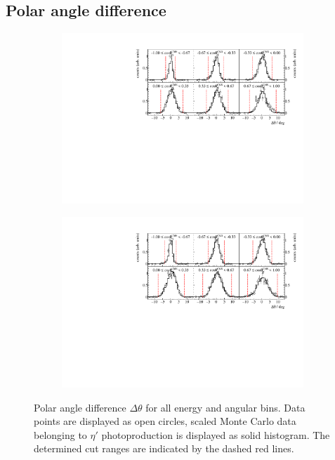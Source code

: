 \subsection{Polar angle difference}
\begin{figure}[H]
	\centering
	\begin{subfigure}{\linewidth}
		\includegraphics[width=\linewidth]{../figs/hydrogen/bin_cuts/thetacut_ebin1.pdf}
	\end{subfigure}
	
	\begin{subfigure}{\linewidth}
		\includegraphics[width=\linewidth]{../figs/hydrogen/bin_cuts/thetacut_ebin2.pdf}
	\end{subfigure}
\caption{Polar angle difference $\Delta\theta$ for all energy and angular bins. Data points are displayed as open circles, scaled Monte Carlo data belonging to $\eta'$ photoproduction is displayed as solid histogram. The determined cut ranges are indicated by the dashed red lines.}
\end{figure}
